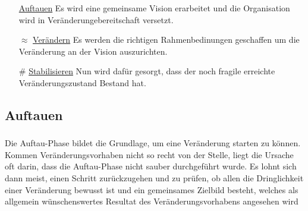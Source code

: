 \documentclass[aspectratio=169]{beamer}
\begin{document}
\begin{frame}
\frametitle{\secname}\framesubtitle{\subsecname}
\begin{itemize}
\setlength\itemsep{1em}
\item[\color{ice-blue}\SnowflakeChevron]\underline{Auftauen}\newline
Es wird eine gemeinsame Vision erarbeitet und die Organisation wird in Veränderungebereitschaft versetzt.
\item[\color{ipt-red}\selectfont$\approx$]\underline{Verändern}\newline
Es werden die richtigen Rahmenbedinungen geschaffen um die Veränderung an der Vision auszurichten.
\item[\selectfont\color{ipt-blue}\#]\underline{Stabilisieren}\newline
Nun wird dafür gesorgt, dass der noch fragile erreichte Veränderungszustand Bestand hat.
\end{itemize}
\end{frame}


\subsection{Auftauen}
\begin{frame}
\frametitle{\subsecname}\framesubtitle{\secname}
Die Auftau-Phase bildet die Grundlage, um eine Veränderung starten zu können. Kommen Veränderungsvorhaben nicht so recht von der Stelle, liegt die Ursache oft darin, dass die Auftau-Phase nicht sauber durchgeführt wurde. Es lohnt sich dann meist, einen Schritt zurückzugehen und zu prüfen, ob allen die Dringlichkeit einer Veränderung bewusst ist und ein gemeinsames Zielbild besteht, welches als allgemein wünschenswertes Resultat des Veränderungsvorhabens angesehen wird
\end{frame}
\end{document}
